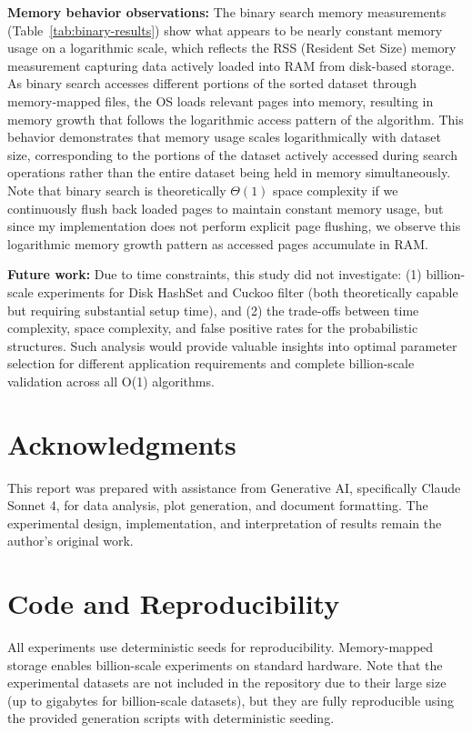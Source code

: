 \documentclass[sigconf]{acmart}
\begin{document}
\textbf{Memory behavior observations:} The binary search memory measurements (Table~\ref{tab:binary-results}) show what appears to be nearly constant memory usage on a logarithmic scale, which reflects the RSS (Resident Set Size) memory measurement capturing data actively loaded into RAM from disk-based storage. As binary search accesses different portions of the sorted dataset through memory-mapped files, the OS loads relevant pages into memory, resulting in memory growth that follows the logarithmic access pattern of the algorithm. This behavior demonstrates that memory usage scales logarithmically with dataset size, corresponding to the portions of the dataset actively accessed during search operations rather than the entire dataset being held in memory simultaneously. Note that binary search is theoretically $\Theta(1)$ space complexity if we continuously flush back loaded pages to maintain constant memory usage, but since my implementation does not perform explicit page flushing, we observe this logarithmic memory growth pattern as accessed pages accumulate in RAM.

\textbf{Future work:} Due to time constraints, this study did not investigate: (1) billion-scale experiments for Disk HashSet and Cuckoo filter (both theoretically capable but requiring substantial setup time), and (2) the trade-offs between time complexity, space complexity, and false positive rates for the probabilistic structures. Such analysis would provide valuable insights into optimal parameter selection for different application requirements and complete billion-scale validation across all O(1) algorithms.

\section{Acknowledgments}
This report was prepared with assistance from Generative AI, specifically Claude Sonnet 4, for data analysis, plot generation, and document formatting. The experimental design, implementation, and interpretation of results remain the author's original work.

\section{Code and Reproducibility}
All experiments use deterministic seeds for reproducibility. Memory-mapped storage enables billion-scale experiments on standard hardware. Note that the experimental datasets are not included in the repository due to their large size (up to gigabytes for billion-scale datasets), but they are fully reproducible using the provided generation scripts with deterministic seeding.
\end{document}

